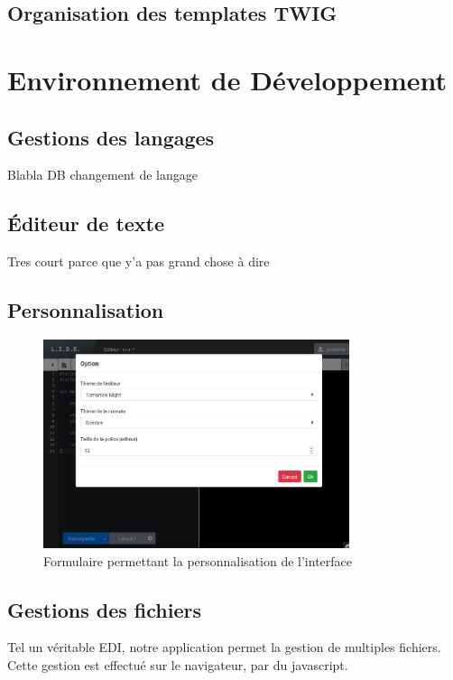 
\subsection{Organisation des templates TWIG}

\section{Environnement de Développement}

\subsection{Gestions des langages}
Blabla DB changement de langage

\subsection{Éditeur de texte}
Tres court parce que y'a pas grand chose à dire

\subsection{Personnalisation}

\begin{figure}
\centering
\includegraphics[width=0.8\textwidth]{./frontend/example_personnalisation.png}
\caption{Formulaire permettant la personnalisation de l'interface}
\end{figure}

\subsection{Gestions des fichiers}
Tel un véritable EDI, notre application permet la gestion de multiples fichiers. Cette gestion est effectué sur le navigateur, par du javascript.

